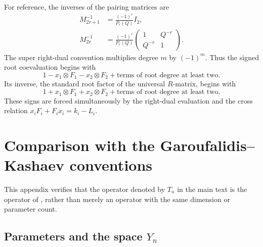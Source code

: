 \documentclass[11pt,a4paper]{article}
\newcommand{\ot}{\otimes}
\theoremstyle{definition}
\theoremstyle{remark}
\begin{document}
For reference, the inverses of the pairing matrices are
\[
\begin{aligned}
 M_{2r+1}^{-1}&=\frac{(-1)^r}{P_r(Q)}I_2,\\
 M_{2r}^{-1}&=\frac{(-1)^r}{P_r(Q)}
 \begin{pmatrix}1&Q^{-r}\\Q^{-r}&1\end{pmatrix}.
\end{aligned}
\]
The super right-dual convention multiplies degree \(m\) by \((-1)^m\).
Thus the signed root coevaluation begins with
\[
 1-x_1\ot F_1-x_2\ot F_2+\text{terms of root degree at least two}.
\]
Its inverse, the standard root factor of the universal \(R\)-matrix,
begins with
\[
 1+x_1\ot F_1+x_2\ot F_2+\text{terms of root degree at least two}.
\]
These signs are forced simultaneously by the right-dual evaluation and
the cross relation \(x_iF_i+F_ix_i=k_i-L_i\).

\section{Comparison with the Garoufalidis--Kashaev conventions}
\label{app:GK-conventions}

This appendix verifies that the operator denoted by \(T_n\) in the main
text is the operator of \cite[Theorem~3.6 and Definition~7.5]{GK}, rather
than merely an operator with the same dimension or parameter count.

\subsection{Parameters and the space \texorpdfstring{\(Y_n\)}{Yn}}
\label{app:GK-parameters}
\end{document}
